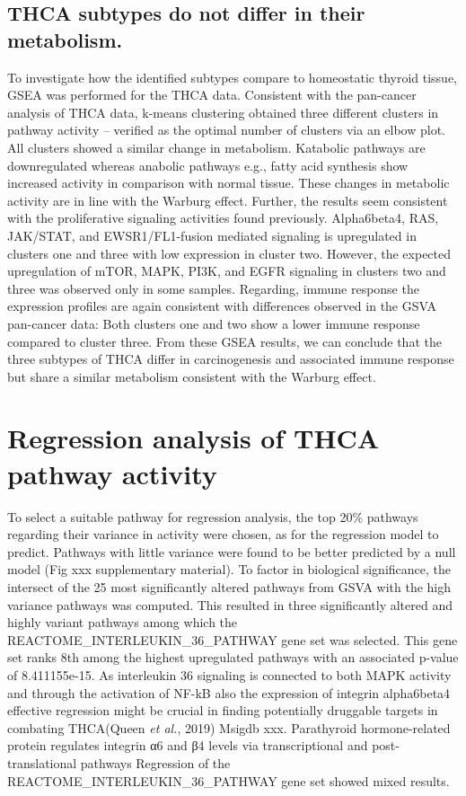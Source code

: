 \documentclass[
  parskip,
  oneside]{scrreprt}
\begin{document}
\hypertarget{thca-subtypes-do-not-differ-in-their-metabolism.}{%
\subsection{THCA subtypes do not differ in their
metabolism.}\label{thca-subtypes-do-not-differ-in-their-metabolism.}}

To investigate how the identified subtypes compare to homeostatic
thyroid tissue, GSEA was performed for the THCA data. Consistent with
the pan-cancer analysis of THCA data, k-means clustering obtained three
different clusters in pathway activity -- verified as the optimal number
of clusters via an elbow plot. All clusters showed a similar change in
metabolism. Katabolic pathways are downregulated whereas anabolic
pathways e.g., fatty acid synthesis show increased activity in
comparison with normal tissue. These changes in metabolic activity are
in line with the Warburg effect. Further, the results seem consistent
with the proliferative signaling activities found previously.
Alpha6beta4, RAS, JAK/STAT, and EWSR1/FL1-fusion mediated signaling is
upregulated in clusters one and three with low expression in cluster
two. However, the expected upregulation of mTOR, MAPK, PI3K, and EGFR
signaling in clusters two and three was observed only in some samples.
Regarding, immune response the expression profiles are again consistent
with differences observed in the GSVA pan-cancer data: Both clusters one
and two show a lower immune response compared to cluster three. From
these GSEA results, we can conclude that the three subtypes of THCA
differ in carcinogenesis and associated immune response but share a
similar metabolism consistent with the Warburg effect.

\hypertarget{regression-analysis-of-thca-pathway-activity}{%
\section{Regression analysis of THCA pathway
activity}\label{regression-analysis-of-thca-pathway-activity}}

To select a suitable pathway for regression analysis, the top 20\%
pathways regarding their variance in activity were chosen, as for the
regression model to predict. Pathways with little variance were found to
be better predicted by a null model (Fig xxx supplementary material). To
factor in biological significance, the intersect of the 25 most
significantly altered pathways from GSVA with the high variance pathways
was computed. This resulted in three significantly altered and highly
variant pathways among which the REACTOME\_INTERLEUKIN\_36\_PATHWAY gene
set was selected. This gene set ranks 8th among the highest upregulated
pathways with an associated p-value of 8.411155e-15. As interleukin 36
signaling is connected to both MAPK activity and through the activation
of NF-kB also the expression of integrin alpha6beta4 effective
regression might be crucial in finding potentially druggable targets in
combating THCA(Queen \emph{et al.}, 2019) Msigdb xxx. Parathyroid
hormone-related protein regulates integrin α6 and β4 levels via
transcriptional and post-translational pathways Regression of the
REACTOME\_INTERLEUKIN\_36\_PATHWAY gene set showed mixed results.
\end{document}
